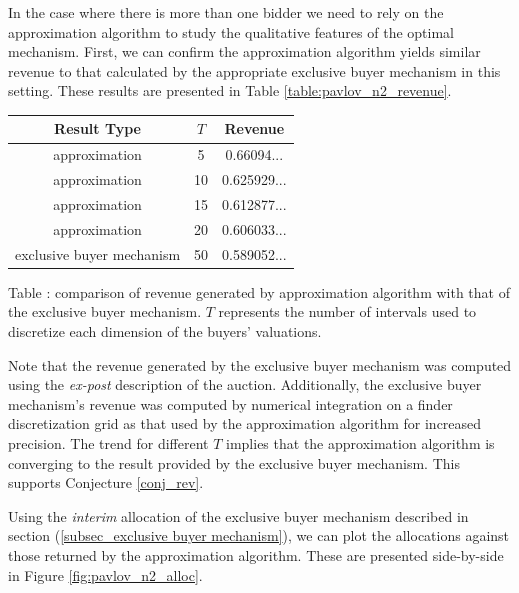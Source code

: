 \documentclass{article}
\newcounter{fig}
\begin{document}
In the case where there is more than one bidder we need to rely on the approximation algorithm to study the qualitative features of the optimal mechanism. First, we can confirm the approximation algorithm yields similar revenue to that calculated by the appropriate exclusive buyer mechanism in this setting. These results are presented in Table \ref{table:pavlov_n2_revenue}.

\begin{center}
    \begin{tabular}{ |c|c|c| } 
    \hline
    Result Type & $T$ & Revenue \\
    \hline
    \hline
    approximation & 5 & 0.66094... \\ 
    approximation & 10 & 0.625929... \\ 
    approximation & 15 & 0.612877... \\ 
    approximation & 20 & 0.606033... \\ 
    exclusive buyer mechanism & 50 & 0.589052... \\
    \hline
    \end{tabular}

    \vspace{1mm}
    \raggedright{\small {\sc Table \thefig\label{table:pavlov_n2_revenue}:} comparison of revenue generated by approximation algorithm with that of the exclusive buyer mechanism. $T$ represents the number of intervals used to discretize each dimension of the buyers' valuations.}
\end{center}

\noindent Note that the revenue generated by the exclusive buyer mechanism was computed using the \textit{ex-post} description of the auction. Additionally, the exclusive buyer mechanism's revenue was computed by numerical integration on a finder discretization grid as that used by the approximation algorithm for increased precision. The trend for different $T$ implies that the approximation algorithm is converging to the result provided by the exclusive buyer mechanism. This supports Conjecture \ref{conj_rev}. 

Using the \textit{interim} allocation of the exclusive buyer mechanism described in section (\ref{subsec_exclusive buyer mechanism}), we can plot the allocations against those returned by the approximation algorithm. These are presented side-by-side in Figure \ref{fig:pavlov_n2_alloc}.
\end{document}
